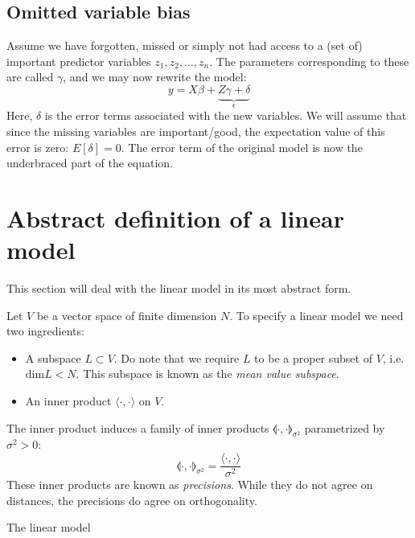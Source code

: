 \documentclass[12pt, a4paper]{article}
\begin{document}
\subsection{Omitted variable bias}
Assume we have forgotten, missed or simply not had access to a (set of) important predictor variables $z_1, z_2,\ldots, z_n$. The parameters corresponding to these are called $\gamma$, and we may now rewrite the model:
\begin{equation}
y=X\beta+\underbrace{Z\gamma+\delta}_{\epsilon}
\end{equation}
Here, $\delta$ is the error terms associated with the new variables. We will assume that since the missing variables are important/good, the expectation value of this error is zero: $E[\delta]=0$. The error term of the original model is now the underbraced part of the equation.

\section{Abstract definition of a linear model}
This section will deal with the linear model in its most abstract form.

Let $V$ be a vector space of finite dimension $N$. To specify a linear model we need two ingredients:
\begin{itemize}
\item A subspace $L\subset V$. Do note that we require $L$ to be a proper subset of $V$, i.e. $\textrm{dim}L<N$. This subspace is known as the \textit{mean value subspace}.
\item An inner product $\langle\cdot,\cdot\rangle$ on $V$.
\end{itemize}
The inner product induces a family of inner products $\llangle\cdot,\cdot\rrangle_{\sigma^2}$ parametrized by $\sigma^2>0$:
\begin{equation}
\llangle\cdot,\cdot\rrangle_{\sigma^2}=\frac{\langle\cdot,\cdot\rangle}{\sigma^2}
\end{equation}
These inner products are known as \textit{precisions}. While they do not agree on distances, the precisions do agree on orthogonality.

The linear model
\end{document}
